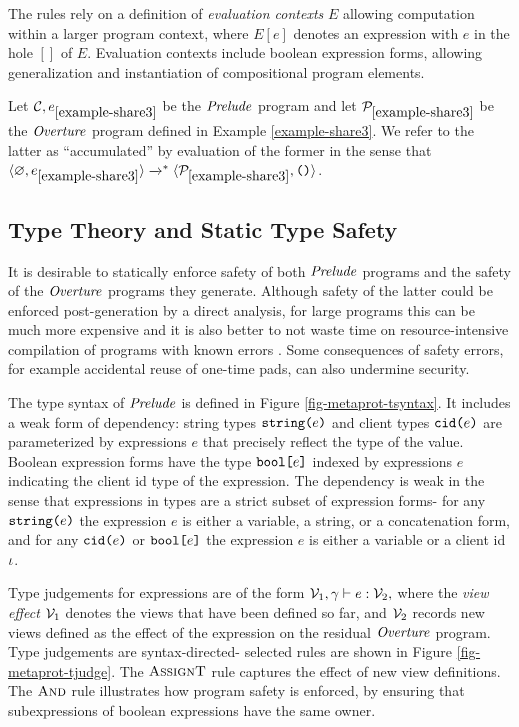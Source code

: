 The rules rely on a definition of \emph{evaluation contexts} $E$
allowing computation within a larger program context, where $E[e]$
denotes an expression with $e$ in the hole $[]$ of $E$. Evaluation
contexts include boolean expression forms, allowing generalization
and instantiation of compositional program elements.
\begin{example}
  \label{example-share3-eval}
  Let $\mathcal{C},e_{\ref{example-share3}}$ be the $\mathit{Prelude}$ program and let 
  $\mathcal{P}_{\ref{example-share3}}$ be the  $\mathit{Overture}$ program defined
  in Example \ref{example-share3}. We refer to the latter as ``accumulated''
  by evaluation of the former in the sense that $\langle \varnothing,e_{\ref{example-share3}} \rangle
  \xrightarrow{}^{*} \langle \mathcal{P}_{\ref{example-share3}},\texttt{()} \rangle$.
\end{example}

\subsection{Type Theory and Static Type Safety}

It is desirable to statically enforce safety of both $\mathit{Prelude}$
programs and the safety of the $\mathit{Overture}$ programs they
generate. Although safety of the latter could be enforced
post-generation by a direct analysis, for large programs this can be
much more expensive and it is also better to not waste time on
resource-intensive compilation of programs with known errors
\cite{kreuter2012billion}. Some consequences of safety errors, for example accidental
reuse of one-time pads, can also undermine security.

The type syntax of $\mathit{Prelude}$ is defined in Figure
\ref{fig-metaprot-tsyntax}. It includes a weak form of dependency:
string types $\texttt{string(}e\texttt{)}$ and client types $\texttt{cid(}e\texttt{)}$
are parameterized by expressions $e$ that precisely reflect the
type of the value. Boolean expression forms have the type
$\texttt{bool[}e\texttt{]}$ indexed by expressions $e$ indicating the client
id type of the expression. The dependency is weak in the
sense that expressions in types are a strict subset of
expression forms- for any $\texttt{string(}e\texttt{)}$ the expression $e$
is either a variable, a string, or a concatenation form,
and for any $\texttt{cid(}e\texttt{)}$ or $\texttt{bool[}e\texttt{]}$ the expression $e$
is either a variable or a client id $\iota$. 

Type judgements for expressions are of the form
$\tjudge{\viewst_1}{\gamma}{e}{\viewst_2}$ where the \emph{view
effect} $\mathcal{V}_1$ denotes the views that have been defined so far,
and $\mathcal{V}_2$ records new views defined as the effect of the
expression on the residual $\mathit{Overture}$ program.  Type judgements are
syntax-directed- selected rules are shown in Figure
\ref{fig-metaprot-tjudge}. The $\text{\sc AssignT}$ rule
captures the effect of new view definitions. The
$\text{\sc And}$ rule illustrates how program safety is enforced,
by ensuring that subexpressions of boolean expressions have the
same owner.

